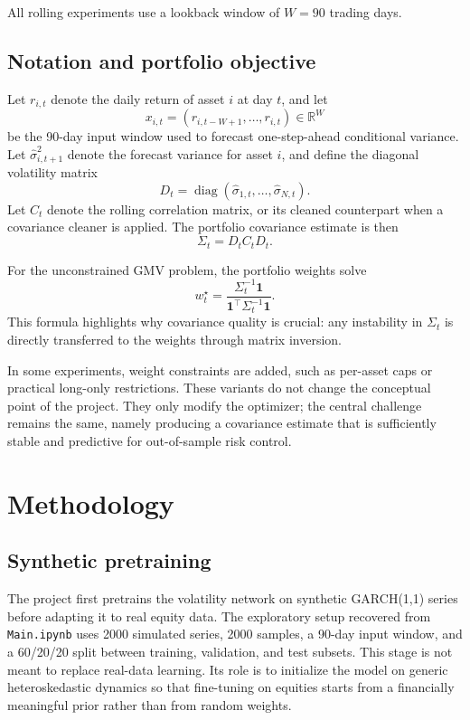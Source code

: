\documentclass[11pt,a4paper]{article}
\newcommand{\ones}{\mathbf{1}}
\newcommand{\diag}{\operatorname{diag}}
\begin{document}
All rolling experiments use a lookback window of $W=90$ trading days.

\subsection{Notation and portfolio objective}

Let $r_{i,t}$ denote the daily return of asset $i$ at day $t$, and let
\[
x_{i,t} = \left(r_{i,t-W+1}, \dots, r_{i,t}\right) \in \mathbb{R}^{W}
\]
be the 90-day input window used to forecast one-step-ahead conditional variance. Let $\hat{\sigma}_{i,t+1}^2$ denote the forecast variance for asset $i$, and define the diagonal volatility matrix
\[
D_t = \diag(\hat{\sigma}_{1,t}, \dots, \hat{\sigma}_{N,t}).
\]
Let $C_t$ denote the rolling correlation matrix, or its cleaned counterpart when a covariance cleaner is applied. The portfolio covariance estimate is then
\[
\Sigma_t = D_t C_t D_t.
\]

For the unconstrained GMV problem, the portfolio weights solve
\[
w_t^\star = \frac{\Sigma_t^{-1}\ones}{\ones^\top \Sigma_t^{-1}\ones}.
\]
This formula highlights why covariance quality is crucial: any instability in $\Sigma_t$ is directly transferred to the weights through matrix inversion.

In some experiments, weight constraints are added, such as per-asset caps or practical long-only restrictions. These variants do not change the conceptual point of the project. They only modify the optimizer; the central challenge remains the same, namely producing a covariance estimate that is sufficiently stable and predictive for out-of-sample risk control.

\section{Methodology}

\subsection{Synthetic pretraining}

The project first pretrains the volatility network on synthetic GARCH(1,1) series before adapting it to real equity data. The exploratory setup recovered from \texttt{Main.ipynb} uses 2000 simulated series, 2000 samples, a 90-day input window, and a 60/20/20 split between training, validation, and test subsets. This stage is not meant to replace real-data learning. Its role is to initialize the model on generic heteroskedastic dynamics so that fine-tuning on equities starts from a financially meaningful prior rather than from random weights.
\end{document}
